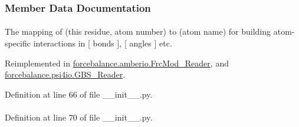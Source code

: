 \subsubsection{\-Member \-Data \-Documentation}
\hypertarget{classforcebalance_1_1BaseReader_a2c46ad6b66cf09a30e917ce4a1997e2a}{
\paragraph[{adict}]{}}\label{classforcebalance_1_1BaseReader_a2c46ad6b66cf09a30e917ce4a1997e2a}


\-The mapping of (this residue, atom number) to (atom name) for building atom-\/specific interactions in \mbox{[} bonds \mbox{]}, \mbox{[} angles \mbox{]} etc. 



\-Reimplemented in \hyperlink{classforcebalance_1_1amberio_1_1FrcMod__Reader_ae3b36131778cad32336f88fdb6d724ee}{forcebalance.\-amberio.\-Frc\-Mod\-\_\-\-Reader}, and \hyperlink{classforcebalance_1_1psi4io_1_1GBS__Reader_aa7cbae977f7e9a4e14ba1d45f62bb5fa}{forcebalance.\-psi4io.\-G\-B\-S\-\_\-\-Reader}.



\-Definition at line 66 of file \-\_\-\-\_\-init\-\_\-\-\_\-.\-py.

\hypertarget{classforcebalance_1_1BaseReader_a69ca7d949a4a3df4d9f61e617fe0e270}{
\paragraph[{\-Atom\-Types}]{}}\label{classforcebalance_1_1BaseReader_a69ca7d949a4a3df4d9f61e617fe0e270}


\-Definition at line 70 of file \-\_\-\-\_\-init\-\_\-\-\_\-.\-py.

